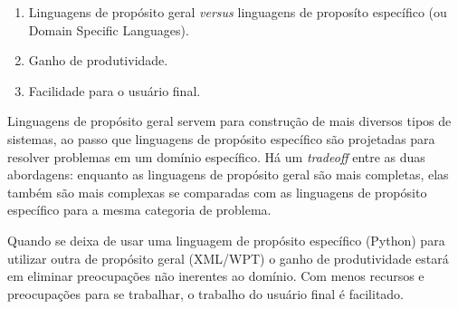 \begin{enumerate}
	\item Linguagens de propósito geral \emph{versus} linguagens de proposíto específico (ou Domain Specific Languages).
	\item Ganho de produtividade.
	\item Facilidade para o usuário final.
\end{enumerate}

Linguagens de propósito geral servem para construção de mais diversos tipos de sistemas, ao passo que linguagens de propósito específico são projetadas para resolver problemas em um domínio específico. Há um \emph{tradeoff} entre as duas abordagens: enquanto as linguagens de propósito geral são mais completas, elas também são mais complexas se comparadas com as linguagens de propósito específico para a mesma categoria de problema.

Quando se deixa de usar uma linguagem de propósito específico (Python) para utilizar outra de propósito geral (XML/WPT) o ganho de produtividade estará em eliminar preocupações não inerentes ao domínio. Com menos recursos e preocupações para se trabalhar, o trabalho do usuário final é facilitado.